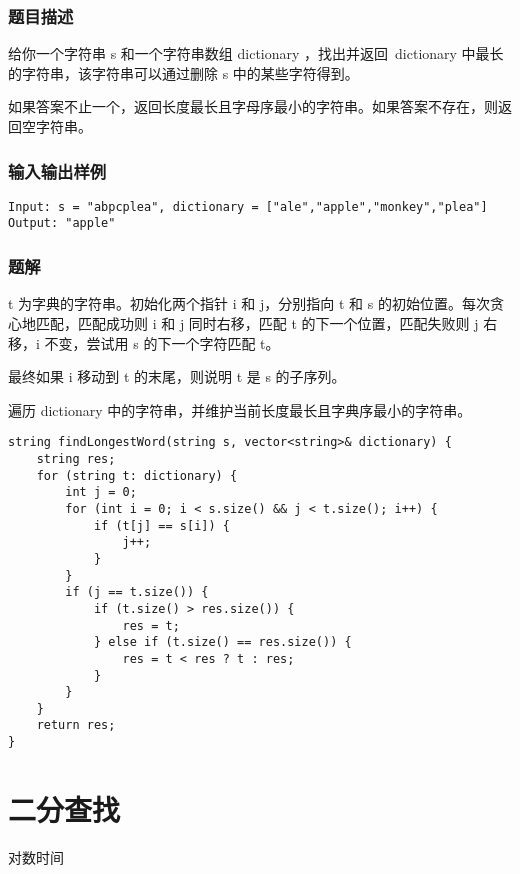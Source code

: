 \documentclass[lang=cn,10pt]{elegantbook}
\begin{document}
\subsection*{题目描述}

给你一个字符串 s 和一个字符串数组 dictionary ，找出并返回 dictionary 中最长的字符串，该字符串可以通过删除 s 中的某些字符得到。

如果答案不止一个，返回长度最长且字母序最小的字符串。如果答案不存在，则返回空字符串。

\subsection*{输入输出样例}

\begin{lstlisting}
Input: s = "abpcplea", dictionary = ["ale","apple","monkey","plea"]
Output: "apple"
\end{lstlisting}

\subsection*{题解}

t 为字典的字符串。初始化两个指针 i 和 j，分别指向 t 和 s 的初始位置。每次贪心地匹配，匹配成功则 i 和 j 同时右移，匹配 t 的下一个位置，匹配失败则 j 右移，i 不变，尝试用 s 的下一个字符匹配 t。

最终如果 i 移动到 t 的末尾，则说明 t 是 s 的子序列。

遍历 dictionary 中的字符串，并维护当前长度最长且字典序最小的字符串。

\begin{lstlisting}
string findLongestWord(string s, vector<string>& dictionary) {
	string res;
	for (string t: dictionary) {
		int j = 0;
		for (int i = 0; i < s.size() && j < t.size(); i++) {
			if (t[j] == s[i]) {
				j++;
			}
		}
		if (j == t.size()) {
			if (t.size() > res.size()) {
				res = t;
			} else if (t.size() == res.size()) {
				res = t < res ? t : res;
			}
		}
	}
	return res;
}
\end{lstlisting}

\chapter{二分查找}

\begin{introduction}[前情提要]
	\item 对数时间
\end{introduction}
\end{document}

